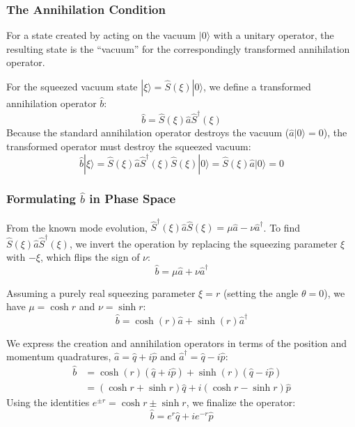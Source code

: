 {\subsubsection{The Annihilation Condition}
For a state created by acting on the vacuum $|0\rangle$ with a unitary operator, the resulting state is the ``vacuum'' for the correspondingly transformed annihilation operator. 

For the squeezed vacuum state $|\xi\rangle = \hat{S}(\xi)|0\rangle$, we define a transformed annihilation operator $\hat{b}$:
\begin{equation*}
\hat{b} = \hat{S}(\xi)\hat{a}\hat{S}^\dagger(\xi)
\end{equation*}
Because the standard annihilation operator destroys the vacuum ($\hat{a}|0\rangle = 0$), the transformed operator must destroy the squeezed vacuum:
\begin{equation*}
\hat{b}|\xi\rangle = \hat{S}(\xi)\hat{a}\hat{S}^\dagger(\xi) \hat{S}(\xi)|0\rangle = \hat{S}(\xi)\hat{a}|0\rangle = 0
\end{equation*}

\subsubsection{Formulating $\hat{b}$ in Phase Space}
From the known mode evolution, $\hat{S}^\dagger(\xi)\hat{a}\hat{S}(\xi) = \mu\hat{a} - \nu\hat{a}^\dagger$. To find $\hat{S}(\xi)\hat{a}\hat{S}^\dagger(\xi)$, we invert the operation by replacing the squeezing parameter $\xi$ with $-\xi$, which flips the sign of $\nu$:
\begin{equation*}
\hat{b} = \mu\hat{a} + \nu\hat{a}^\dagger
\end{equation*}

Assuming a purely real squeezing parameter $\xi = r$ (setting the angle $\theta = 0$), we have $\mu = \cosh r$ and $\nu = \sinh r$:
\begin{equation*}
\hat{b} = \cosh(r)\hat{a} + \sinh(r)\hat{a}^\dagger
\end{equation*}

We express the creation and annihilation operators in terms of the position and momentum quadratures, $\hat{a} = \hat{q} + i\hat{p}$ and $\hat{a}^\dagger = \hat{q} - i\hat{p}$:
\begin{align*}
\hat{b} &= \cosh(r)(\hat{q} + i\hat{p}) + \sinh(r)(\hat{q} - i\hat{p}) \\
&= (\cosh r + \sinh r)\hat{q} + i(\cosh r - \sinh r)\hat{p}
\end{align*}
Using the identities $e^{\pm r} = \cosh r \pm \sinh r$, we finalize the operator:
\begin{equation*}
\hat{b} = e^{r}\hat{q} + i e^{-r} \hat{p}
\end{equation*}

}

